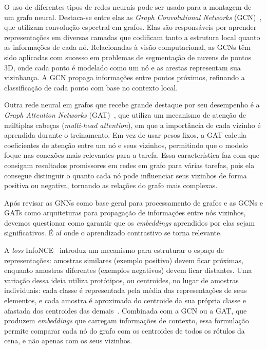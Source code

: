 O uso de diferentes tipos de redes neurais pode ser usado para a montagem de um grafo neural. Destaca-se entre elas as \textit{Graph Convolutional Networks} (GCN)~\cite{kipf2016semi}, que utilizam convolução espectral em grafos. Elas são responsáveis por aprender representações em diversas camadas que codificam tanto a estrutura local quanto as informações de cada nó. Relacionadas à visão computacional, as GCNs têm sido aplicadas com sucesso em problemas de segmentação de nuvens de pontos 3D, onde cada ponto é modelado como um nó e as arestas representam sua vizinhança. A GCN propaga informações entre pontos próximos, refinando a classificação de cada ponto com base no contexto local.

Outra rede neural em grafos que recebe grande destaque por seu desempenho é a \textit{Graph Attention Networks} (GAT)~\cite{velivckovic2017graph}, que utiliza um mecanismo de atenção de múltiplas cabeças (\textit{multi-head attention}), em que a importância de cada vizinho é aprendida durante o treinamento. Em vez de usar pesos fixos, a GAT calcula coeficientes de atenção entre um nó e seus vizinhos, permitindo que o modelo foque nas conexões mais relevantes para a tarefa. Essa característica faz com que consigam resultados promissores em redes em grafo para várias tarefas, pois ela consegue distinguir o quanto cada nó pode influenciar seus vizinhos de forma positiva ou negativa, tornando as relações do grafo mais complexas.

Após revisar as GNNs como base geral para processamento de grafos e as GCNs e GATs como arquiteturas para propagação de informações entre nós vizinhos, devemos questionar como garantir que os \textit{embeddings} aprendidos por elas sejam significativos. É aí onde o aprendizado contrastivo se torna relevante.

A \emph{loss} InfoNCE~\cite{oord2018representation} introduz um mecanismo para estruturar o espaço de representações: amostras similares (exemplo positivo) devem ficar próximas, enquanto amostras diferentes (exemplos negativos) devem ficar distantes. Uma variação dessa ideia utiliza protótipos, ou centroides, no lugar de amostras individuais: cada classe é representada pela média das representações de seus elementos, e cada amostra é aproximada do centroide da sua própria classe e afastada dos centroides das demais~\cite{snell2017prototypical,li2021prototypical}. Combinada com a GCN ou a GAT, que produzem \textit{embeddings} que carregam informações de contexto, essa formulação permite comparar cada nó do grafo com os centroides de todos os rótulos da cena, e não apenas com os seus vizinhos.

